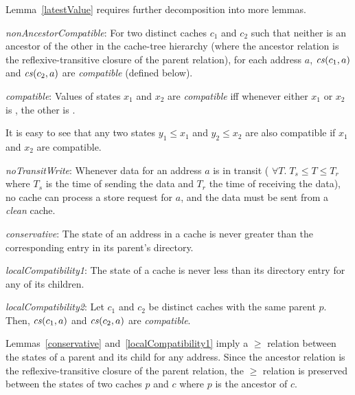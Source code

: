 Lemma~\ref{latestValue} requires further decomposition into more
lemmas.

\begin{lemma}
\textit{nonAncestorCompatible}: For two distinct caches $c_1$ and $c_2$ such
that neither is an ancestor of the other in the cache-tree hierarchy (where
the ancestor relation is the reflexive-transitive closure of the parent relation),
for each address $a$, $\mathit{cs}(c_1,a)$ and $\mathit{cs}(c_2,a)$ are
\textit{compatible} (defined below).
\label{nonAncestorCompatible}
\end{lemma}
\begin{defn}
\textit{compatible}: Values of states $x_1$ and $x_2$ are \textit{compatible}
iff whenever either $x_1$ or $x_2$ is \Mo{}, the other is \In.
\label{compatible}
\end{defn}

It is easy to see that any two states $y_1 \le x_1$ and $y_2 \le x_2$ are also
compatible if $x_1$ and $x_2$ are compatible.

\begin{lemma}
\textit{noTransitWrite}: Whenever data for an address $a$ is in transit (\ie{}
$\forall T. \; T_s \le T \le T_r$ where $T_s$ is the time of sending the data and
$T_r$ the time of receiving the data), no cache can process a store request for
$a$, and the data must be sent from a \textit{clean} cache.
\label{noTransitWrite}
\end{lemma}

\begin{lemma}
\textit{conservative}: The state of an address in a cache is never greater than
the corresponding entry in its parent's directory.
\label{conservative}
\end{lemma}

\begin{lemma}
\textit{localCompatibility1}:
The state of a cache is never less than its directory entry for any of
its children.
\label{localCompatibility1}
\end{lemma}
\begin{lemma}
\textit{localCompatibility2}: Let $c_1$ and $c_2$ be distinct caches with the
same parent $p$. Then, $\mathit{cs}(c_1, a)$ and $\mathit{cs}(c_2, a)$ are
\textit{compatible}.
\label{localCompatibility2}
\end{lemma}

Lemmas~\ref{conservative} and~\ref{localCompatibility1} imply a
$\ge$ relation between the states of a parent and its child for any address.
Since the ancestor relation is the reflexive-transitive closure of the parent
relation, the $\ge$ relation is preserved between the states of two caches $p$
and $c$ where $p$ is the ancestor of $c$.

